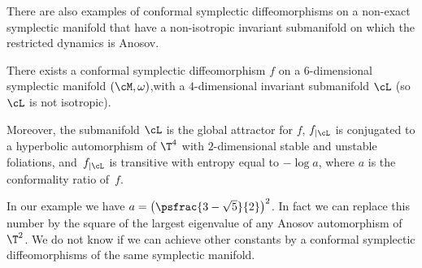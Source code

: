 There are also examples of conformal symplectic diffeomorphisms on a non-exact symplectic manifold that have a non-isotropic invariant submanifold on which the restricted dynamics is Anosov.
\begin{proposition}\label{Pnonisotrop}
There exists a conformal symplectic diffeomorphism $f$ on a $6$\nobreakdash-di\-men\-sional symplectic manifold $({\cM}, \omega)$,with a $4$\nobreakdash-dimensional invariant submanifold ${\cL}$ (so ${\cL}$ is not isotropic).

Moreover, the submanifold ${\cL}$ is the global attractor for $f$, $f_{|{\cL}}$ is conjugated to a hyperbolic automorphism of $\T^4$ with $2$-dimensional stable and unstable foliations, and~$f_{|{\cL}}$ is transitive with entropy equal to $- \log a$, where $a$ is the conformality ratio of~$f$.
\end{proposition}

\begin{question*}
In our example we have
$a=\bigl(\psfrac{3-\sqrt{5}}{2}\bigr)^2$. In fact we can replace
this number by the square of the largest eigenvalue of any Anosov
automorphism of~$\T^2$. We do not know if we can achieve other
constants by a conformal symplectic diffeomorphisms of the same symplectic manifold.
\end{question*}

